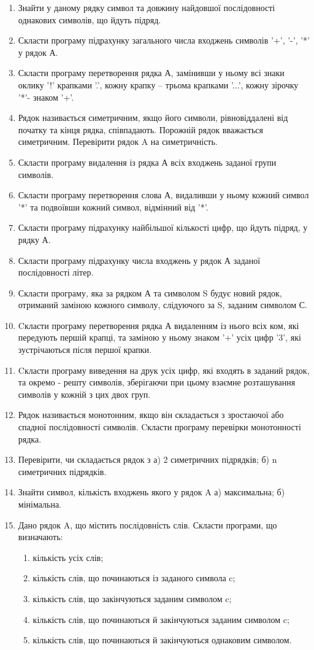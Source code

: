 \documentclass[]{article}
\makeatletter
\newcommand{\xslalph}[1]{\expandafter\@xslalph\csname c@#1\endcsname}
\newcommand{\@xslalph}[1]{%
    \ifcase#1\or а\or б\or в\or г\or д\or e\or є\or ж\or з\or i%
    \or й\or к\or л\or м\or н\or о\or п\or р\or с\or т%
    \or у\or ф\or х\or ц\or ч\or ш\or ю\or я\or аа\or бб\or вв %
    \else\@ctrerr\fi%
}
\makeatother
\begin{document}
\begin{enumerate}
\begin{enumerate}[label=\xslalph*)]
\end{enumerate}
\item  Знайти у даному рядку символ та довжину найдовшої послідовності однакових символів, що йдуть підряд.
\item  Скласти  програму підрахунку загального числа входжень символів '+', '-', '*' у рядок А.
\item  Скласти  програму перетворення рядка А, замінивши у ньому всі знаки оклику '!' крапками '.', кожну крапку – трьома крапками '...', кожну зірочку '*'- знаком '+'.
\item  Рядок називається симетричним, якщо його символи, рівновіддалені від початку та кінця рядка, співпадають. Порожній рядок вважається симетричним. Перевірити рядок A на симетричність.
\item  Скласти програму видалення із рядка А всіх входжень заданої групи символів.
\item  Скласти  програму перетворення слова А, видаливши у ньому кожний символ '*' та подвоївши кожний символ, відмінний від '*'.
\item  Скласти  програму підрахунку найбільшої кількості цифр, що йдуть підряд, у рядку А.
\item  Скласти  програму підрахунку числа входжень у рядок А заданої послідовності літер.
\item  Скласти  програму, яка за рядком А та символом S будує новий рядок, отриманий заміною кожного символу, слідуючого за S, заданим символом С.
\item  Cкласти  програму перетворення рядка А видаленням із нього всіх ком, які передують першій крапці, та заміною у ньому знаком '+' усіх цифр '3', які зустрічаються після першої крапки.
\item  Cкласти  програму виведення на друк усіх цифр, які входять в заданий рядок, та окремо - решту символів, зберігаючи при цьому взаємне розташування символів у кожній з цих двох груп.
\item  Рядок називається монотонним, якщо він складається з зростаючої або спадної послідовності символів. Cкласти  програму перевірки монотонності рядка.
\item  Перевірити, чи складається рядок з
а) 2 симетричних підрядків;
б) n симетричних підрядків.
\item  Знайти символ, кількість входжень якого у рядок A
а) максимальна;
б) мінімальна.
\item  Дано рядок A, що містить послідовність слів. Скласти програми, що визначають:
\begin{enumerate}[label=\xslalph*)]
\item кількість усіх слів;
\item кількість слів, що починаються із заданого символа c;
\item кількість слів, що закінчуються заданим символом c;
\item кількість слів, що починаються й закінчуються заданим символом c;
\item кількість слів, що починаються й закінчуються однаковим символом.


\end{enumerate}
\end{enumerate}
\end{document}
